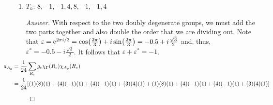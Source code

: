 \documentclass[../psets.tex]{subfiles}
\begin{document}
\begin{enumerate}[label={\Roman*)}]
\begin{enumerate}[label={\alph*)}]
\begin{proof}[Answer]
            \begin{align*}
                \hspace{-3em}a_{A_1} &= \frac{1}{24}\sum_{R_c}g_c\chi_\Gamma(R_c)\chi_{A_1}(R_c) = \frac{1}{24}[(1)(13)(1)+(8)(1)(1)+(3)(5)(1)+(6)(-3)(1)+(6)(-3)(1)] = 0\\
                \hspace{-3em}a_{A_2} &= \frac{1}{24}\sum_{R_c}g_c\chi_\Gamma(R_c)\chi_{A_2}(R_c) = \frac{1}{24}[(1)(13)(1)+(8)(1)(1)+(3)(5)(1)+(6)(-3)(-1)+(6)(-3)(-1)] = 3\\
                \hspace{-3em}a_{E}   &= \frac{1}{24}\sum_{R_c}g_c\chi_\Gamma(R_c)\chi_{E}(R_c)   = \frac{1}{24}[(1)(13)(2)+(8)(1)(-1)+(3)(5)(2)+(6)(-3)(0)+(6)(-3)(0)] = 2\\
                \hspace{-3em}a_{T_1} &= \frac{1}{24}\sum_{R_c}g_c\chi_\Gamma(R_c)\chi_{T_1}(R_c) = \frac{1}{24}[(1)(13)(3)+(8)(1)(0)+(3)(5)(-1)+(6)(-3)(1)+(6)(-3)(-1)] = 1\\
                \hspace{-3em}a_{T_2} &= \frac{1}{24}\sum_{R_c}g_c\chi_\Gamma(R_c)\chi_{T_2}(R_c) = \frac{1}{24}[(1)(13)(3)+(8)(1)(0)+(3)(5)(-1)+(6)(-3)(-1)+(6)(-3)(1)] = 1
            \end{align*}
            Therefore, we know that
            \begin{equation*}
                \boxed{\Gamma = 3A_2+2E+T_1+T_2}
            \end{equation*}
        \end{proof}
        \item $T_h$: $8,-1,-1,4,8,-1,-1,4$
        \begin{proof}[Answer]
            With respect to the two doubly degenerate groups, we must add the two parts together and also double the order that we are dividing out. Note that $\varepsilon=\e[2\pi i/3]=\cos(\frac{2\pi}{3})+i\sin(\frac{2\pi}{3})=-0.5+i\frac{\sqrt{3}}{2}$ and, thus, $\varepsilon^*=-0.5-i\frac{\sqrt{3}}{2}$. It follows that $\varepsilon+\varepsilon^*=-1$.
            \begin{align*}
                \hspace{-4em}a_{A_g} &= \frac{1}{24}\sum_{R_c}g_c\chi_\Gamma(R_c)\chi_{A_g}(R_c)\\
                \hspace{-4em}&= \frac{1}{24}[(1)(8)(1)+(4)(-1)(1)+(4)(-1)(1)+(3)(4)(1)+(1)(8)(1)+(4)(-1)(1)+(4)(-1)(1)+(3)(4)(1)]\\

\end{align*}
\end{proof}
\end{enumerate}
\end{enumerate}
\end{document}
